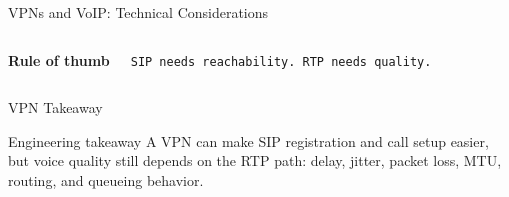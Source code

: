 \documentclass[aspectratio=169]{beamer}
\begin{document}
\begin{frame}{VPNs and VoIP: Technical Considerations}
\begin{columns}[T]
\textbf{Rule of thumb}

\begin{center}
\texttt{SIP needs reachability. RTP needs quality.}
\end{center}

\end{columns}

\end{frame}

\begin{frame}{VPN Takeaway}

\begin{alertblock}{Engineering takeaway}
A VPN can make SIP registration and call setup easier, but voice quality still depends on the RTP path: delay, jitter, packet loss, MTU, routing, and queueing behavior.
\end{alertblock}

\end{frame}
\end{document}
